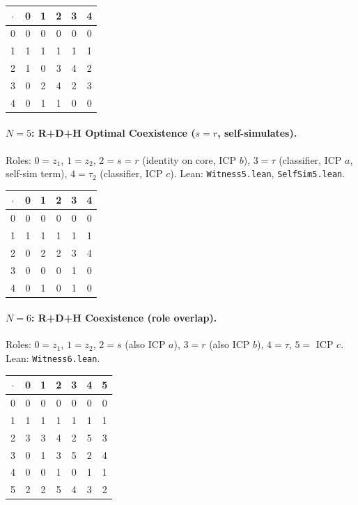 \documentclass[sigconf,screen]{acmart}
\newcommand{\dotop}{\cdot}
\theoremstyle{remark}
\begin{document}
\medskip
{\small
\begin{tabular}{c|ccccc}
$\dotop$ & 0 & 1 & 2 & 3 & 4 \\\hline
0 & 0 & 0 & 0 & 0 & 0 \\
1 & 1 & 1 & 1 & 1 & 1 \\
2 & 1 & 0 & 3 & 4 & 2 \\
3 & 0 & 2 & 4 & 2 & 3 \\
4 & 0 & 1 & 1 & 0 & 0 \\
\end{tabular}}

\paragraph{$N\!=\!5$: R+D+H Optimal Coexistence ($s = r$, self-simulates).}
Roles: $0 = z_1$, $1 = z_2$, $2 = s = r$ (identity on core, ICP $b$), $3 = \tau$ (classifier, ICP $a$, self-sim term), $4 = \tau_2$ (classifier, ICP $c$). \quad Lean: \texttt{Witness5.lean}, \texttt{SelfSim5.lean}.

\medskip
{\small
\begin{tabular}{c|ccccc}
$\dotop$ & 0 & 1 & 2 & 3 & 4 \\\hline
0 & 0 & 0 & 0 & 0 & 0 \\
1 & 1 & 1 & 1 & 1 & 1 \\
2 & 0 & 2 & 2 & 3 & 4 \\
3 & 0 & 0 & 0 & 1 & 0 \\
4 & 0 & 1 & 0 & 1 & 0 \\
\end{tabular}}

\paragraph{$N\!=\!6$: R+D+H Coexistence (role overlap).}
Roles: $0 = z_1$, $1 = z_2$, $2 = s$ (also ICP $a$), $3 = r$ (also ICP $b$), $4 = \tau$, $5 =$ ICP $c$. \quad Lean: \texttt{Witness6.lean}.

\medskip
{\small
\begin{tabular}{c|cccccc}
$\dotop$ & 0 & 1 & 2 & 3 & 4 & 5 \\\hline
0 & 0 & 0 & 0 & 0 & 0 & 0 \\
1 & 1 & 1 & 1 & 1 & 1 & 1 \\
2 & 3 & 3 & 4 & 2 & 5 & 3 \\
3 & 0 & 1 & 3 & 5 & 2 & 4 \\
4 & 0 & 0 & 1 & 0 & 1 & 1 \\
5 & 2 & 2 & 5 & 4 & 3 & 2 \\
\end{tabular}}
\end{document}
